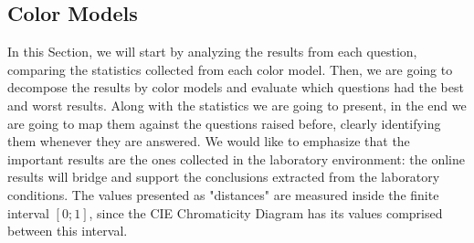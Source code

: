 \subsection{Color Models}
\label{subsec:results_colormodels}
%
In this Section, we will start by analyzing the results from each question, comparing the statistics collected from each color model. Then, we are going to decompose the results by color models and evaluate which questions
had the best and worst results. Along with the statistics we are going to present, in the end we are going to map them against the questions raised before, clearly identifying them whenever they are answered. We would like
to emphasize that the important results are the ones collected in the laboratory environment: the online results will bridge and support the conclusions extracted from the laboratory conditions. The values presented as "distances"
are measured inside the finite interval $[0 ; 1]$, since the CIE Chromaticity Diagram has its values comprised between this interval. \par
%
